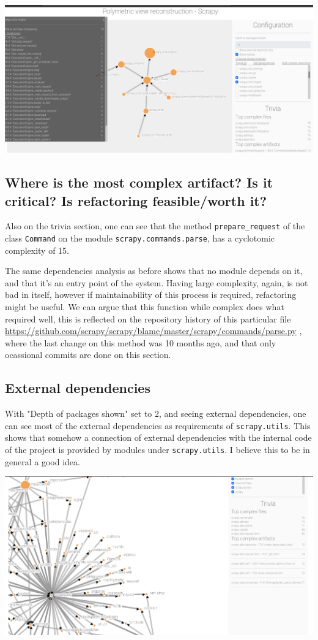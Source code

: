 \documentclass[a4paper,11pt]{article}
\begin{document}
\begin{center}
\includegraphics[width=.9\linewidth]{../screenshots/coreengine.png}
\end{center}

\subsection{Where is the most complex artifact? Is it critical? Is refactoring feasible/worth it?}
\label{sec:org61ce8f5}
Also on the trivia section, one can see that the method \texttt{prepare\_request} of the class \texttt{Command} on the module \texttt{scrapy.commands.parse}, has a cyclotomic complexity of 15.

The same dependencies analysis as before shows that no module depends on it, and that it's an entry point of the system. Having large complexity, again, is not bad in itself, however if maintainability of this process is required, refactoring might be useful. We can argue that this function while complex does what required well, this is reflected on the repository history of this particular file \url{https://github.com/scrapy/scrapy/blame/master/scrapy/commands/parse.py} , where the last change on this method was 10 months ago, and that only ocassional commits are done on this section.

\subsection{External dependencies}
\label{sec:orgeeba071}
With "Depth of packages shown" set to 2, and seeing external dependencies, one can see most of the external dependencies as requirements of \texttt{scrapy.utils}. This shows that somehow a connection of external dependencies with the internal code of the project is provided by modules under \texttt{scrapy.utils}. I believe this to be in general a good idea.

\begin{center}
\includegraphics[width=.9\linewidth]{../screenshots/external_deps.png}
\end{center}
\end{document}
